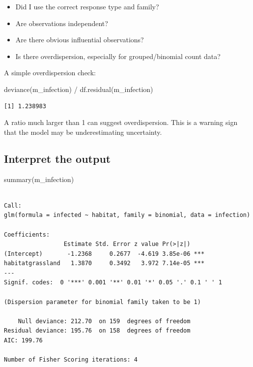 \documentclass[
  letterpaper,
  8pt,
  a4paper]{book}
\newenvironment{Shaded}{\begin{snugshade}}{\end{snugshade}}
\newcommand{\FunctionTok}[1]{\textcolor[rgb]{0.28,0.35,0.67}{#1}}
\newcommand{\NormalTok}[1]{\textcolor[rgb]{0.00,0.23,0.31}{#1}}
\newcommand{\SpecialCharTok}[1]{\textcolor[rgb]{0.37,0.37,0.37}{#1}}
\providecommand{\tightlist}{%
  \setlength{\itemsep}{0pt}\setlength{\parskip}{0pt}}
\begin{document}
\begin{itemize}
\tightlist
\item
  Did I use the correct response type and family?
\item
  Are observations independent?
\item
  Are there obvious influential observations?
\item
  Is there overdispersion, especially for grouped/binomial count data?
\end{itemize}

A simple overdispersion check:

\begin{Shaded}
\begin{Highlighting}[]
\FunctionTok{deviance}\NormalTok{(m\_infection) }\SpecialCharTok{/} \FunctionTok{df.residual}\NormalTok{(m\_infection)}
\end{Highlighting}
\end{Shaded}

\begin{verbatim}
[1] 1.238983
\end{verbatim}

A ratio much larger than 1 can suggest overdispersion. This is a warning
sign that the model may be underestimating uncertainty.

\subsection*{Interpret the output}\label{interpret-the-output-1}

\begin{Shaded}
\begin{Highlighting}[]
\FunctionTok{summary}\NormalTok{(m\_infection)}
\end{Highlighting}
\end{Shaded}

\begin{verbatim}

Call:
glm(formula = infected ~ habitat, family = binomial, data = infection)

Coefficients:
                 Estimate Std. Error z value Pr(>|z|)    
(Intercept)       -1.2368     0.2677  -4.619 3.85e-06 ***
habitatgrassland   1.3870     0.3492   3.972 7.14e-05 ***
---
Signif. codes:  0 '***' 0.001 '**' 0.01 '*' 0.05 '.' 0.1 ' ' 1

(Dispersion parameter for binomial family taken to be 1)

    Null deviance: 212.70  on 159  degrees of freedom
Residual deviance: 195.76  on 158  degrees of freedom
AIC: 199.76

Number of Fisher Scoring iterations: 4
\end{verbatim}
\end{document}
